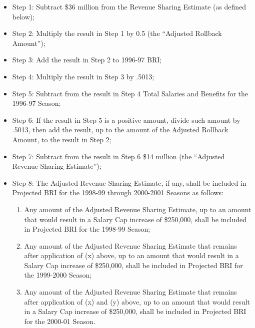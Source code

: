 \documentclass[
]{book}
\providecommand{\tightlist}{%
  \setlength{\itemsep}{0pt}\setlength{\parskip}{0pt}}
\begin{document}
\begin{enumerate}
\begin{enumerate}
\begin{enumerate}
      \begin{itemize}
      \tightlist
      \item
        Step 1: Subtract \$36 million from the Revenue Sharing Estimate (as defined below);
      \item
        Step 2: Multiply the result in Step 1 by 0.5 (the ``Adjusted Rollback Amount'');
      \item
        Step 3: Add the result in Step 2 to 1996-97 BRI;
      \item
        Step 4: Multiply the result in Step 3 by .5013;
      \item
        Step 5: Subtract from the result in Step 4 Total Salaries and Benefits for the 1996-97 Season;
      \item
        Step 6: If the result in Step 5 is a positive amount, divide such amount by .5013, then add the result, up to the amount of the Adjusted Rollback Amount, to the result in Step 2;
      \item
        Step 7: Subtract from the result in Step 6 \$14 million (the ``Adjusted Revenue Sharing Estimate'');
      \item
        Step 8: The Adjusted Revenue Sharing Estimate, if any, shall be included in Projected BRI for the 1998-99 through 2000-2001 Seasons as follows:

        \begin{enumerate}
        \def\labelenumiv{(\alph{enumiv})}
        \setcounter{enumiv}{23}
        \tightlist
        \item
          Any amount of the Adjusted Revenue Sharing Estimate, up to an amount that would result in a Salary Cap increase of \$250,000, shall be included in Projected BRI for the 1998-99 Season;
        \item
          Any amount of the Adjusted Revenue Sharing Estimate that remains after application of (x) above, up to an amount that would result in a Salary Cap increase of \$250,000, shall be included in Projected BRI for the 1999-2000 Season;
        \item
          Any amount of the Adjusted Revenue Sharing Estimate that remains after application of (x) and (y) above, up to an amount that would result in a Salary Cap increase of \$250,000, shall be included in Projected BRI for the 2000-01 Season.
        \end{enumerate}
      \end{itemize}


\end{enumerate}
\end{enumerate}
\end{enumerate}
\end{document}
